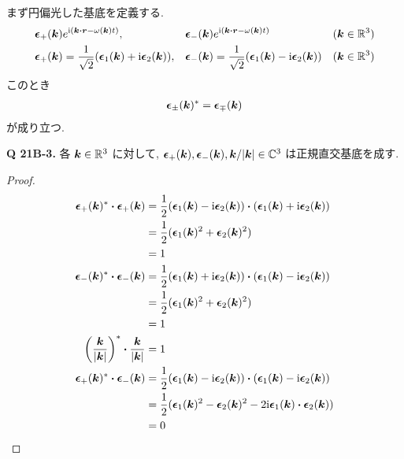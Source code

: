 \documentclass[uplatex,a4paper,dvipdfmx]{jsarticle}
\theoremstyle{definition}
\begin{document}
まず円偏光した基底を定義する.
\begin{align}
  \ee_+(\kk) & e^{\ii(\kk\vdot\rr - \omega(\kk)t)},              & \ee_-(\kk) & e^{\ii(\kk\vdot\rr - \omega(\kk)t)}              & (\kk\in\RR^3) \\
  \ee_+(\kk) & = \frac{1}{\sqrt{2}}(\ee_1(\kk) + \ii\ee_2(\kk)), & \ee_-(\kk) & = \frac{1}{\sqrt{2}}(\ee_1(\kk) - \ii\ee_2(\kk)) & (\kk\in\RR^3)
\end{align}
このとき
\begin{align}
  \vb*{\epsilon}_\pm(\vb*{k})^* = \vb*{\epsilon}_\mp(\vb*{k})
\end{align}
が成り立つ.

\textbf{Q 21B-3.} 各 $\vb*{k}\in\mathbb{R}^3$ に対して, $\vb*{\epsilon}_+(\vb*{k}), \vb*{\epsilon}_-(\vb*{k}), \vb*{k}/|\vb*{k}|\in\mathbb{C}^3$ は正規直交基底を成す.
\begin{proof}
  \begin{align}
    \ee_+(\kk)^*\vdot\ee_+(\kk)                            & = \frac{1}{2}(\ee_1(\kk) - \ii\ee_2(\kk))\vdot(\ee_1(\kk) + \ii\ee_2(\kk)) \\
                                                           & = \frac{1}{2}(\ee_1(\kk)^2 + \ee_2(\kk)^2)                                 \\
                                                           & = 1                                                                        \\
    \ee_-(\kk)^*\vdot\ee_-(\kk)                            & = \frac{1}{2}(\ee_1(\kk) + \ii\ee_2(\kk))\vdot(\ee_1(\kk) - \ii\ee_2(\kk)) \\
                                                           & = \frac{1}{2}(\ee_1(\kk)^2 + \ee_2(\kk)^2)                                 \\
                                                           & = 1                                                                        \\
    \left(\frac{\kk}{|\kk|}\right)^*\vdot\frac{\kk}{|\kk|} & = 1                                                                        \\
    \ee_+(\kk)^*\vdot\ee_-(\kk)                            & = \frac{1}{2}(\ee_1(\kk) - \ii\ee_2(\kk))\vdot(\ee_1(\kk) - \ii\ee_2(\kk)) \\
                                                           & = \frac{1}{2}(\ee_1(\kk)^2 - \ee_2(\kk)^2 - 2\ii\ee_1(\kk)\vdot\ee_2(\kk)) \\
                                                           & = 0                                                                        \\

\end{align}
\end{proof}
\end{document}
